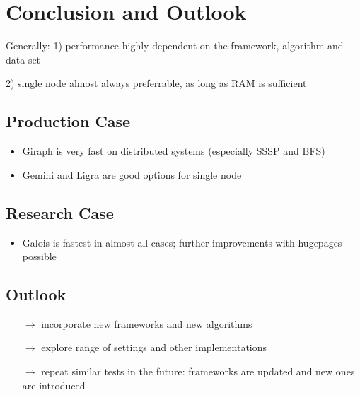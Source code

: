 \documentclass{meetings}
\begin{document}
\restoregeometry



\section{Conclusion and Outlook}
Generally: 1) performance highly dependent on the framework, algorithm and data set

2) single node almost always preferrable, as long as RAM is sufficient
\begin{multicols}{2}
	\subsection{Production Case}
	\begin{itemize}
		\item Giraph is very fast on distributed systems (especially SSSP and BFS)
		\item Gemini and Ligra are good options for single node 
	\end{itemize}

	\columnbreak
	\subsection{Research Case}
	\begin{itemize}
		\item Galois is fastest in almost all cases; further improvements with hugepages possible
	\end{itemize}
\end{multicols}


\subsection{Outlook}
\begin{itemize}
	\item[$\rightarrow$] incorporate new frameworks and new algorithms
	\item[$\rightarrow$] explore range of settings and other implementations
	\item[$\rightarrow$] repeat similar tests in the future: frameworks are updated and new ones are introduced
\end{itemize}
\end{document}

